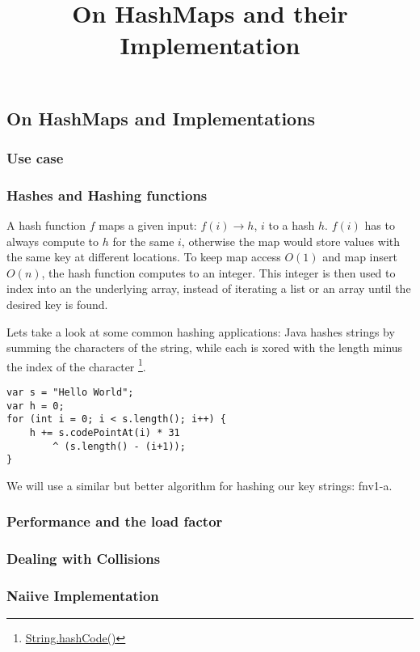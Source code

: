 

\title{On HashMaps and their Implementation}


    \subsection*{On HashMaps and Implementations}

    \subsubsection*{Use case}

    \subsubsection*{Hashes and Hashing functions}

    A hash function $f$ maps a given input: $f(i) \rightarrow h$, $i$ to a hash
    $h$. $f(i)$ has to always compute to $h$ for the same $i$, otherwise the
    map would store values with the same key at different locations. To keep
    map access $O(1)$ and map insert $O(n)$, the hash function computes to an
    integer. This integer is then used to index into an the underlying array,
    instead of iterating a list or an array until the desired key is found. 

    Lets take a look at some common hashing applications: Java hashes strings
    by summing the characters of the string, while each is xored with the
    length minus the index of the character
    \footnote{\href{https://docs.oracle.com/javase/8/docs/api/java/lang/String.html\#hashCode}{String.hashCode()}}.
    \begin{verbatim}
var s = "Hello World";
var h = 0;
for (int i = 0; i < s.length(); i++) {
    h += s.codePointAt(i) * 31 
        ^ (s.length() - (i+1));
}
    \end{verbatim}

    We will use a similar but better algorithm for hashing our key strings:
    fnv1-a.

    \subsubsection*{Performance and the load factor} 

    \subsubsection*{Dealing with Collisions}

    \subsubsection*{Naiive Implementation}


